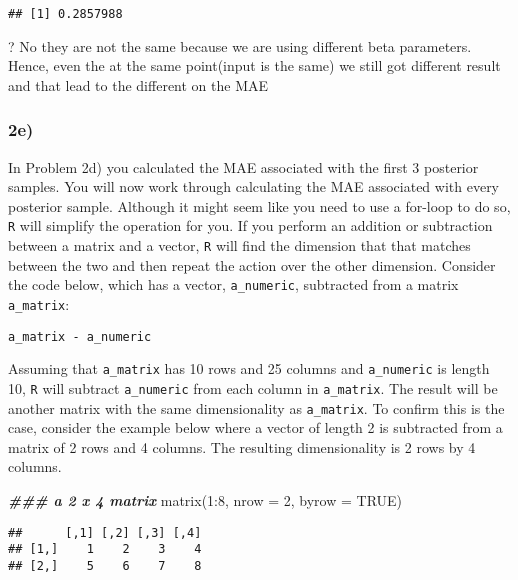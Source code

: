 \documentclass[
]{article}
\newenvironment{Shaded}{\begin{snugshade}}{\end{snugshade}}
\newcommand{\AttributeTok}[1]{\textcolor[rgb]{0.77,0.63,0.00}{#1}}
\newcommand{\ConstantTok}[1]{\textcolor[rgb]{0.00,0.00,0.00}{#1}}
\newcommand{\DecValTok}[1]{\textcolor[rgb]{0.00,0.00,0.81}{#1}}
\newcommand{\DocumentationTok}[1]{\textcolor[rgb]{0.56,0.35,0.01}{\textbf{\textit{#1}}}}
\newcommand{\FunctionTok}[1]{\textcolor[rgb]{0.00,0.00,0.00}{#1}}
\newcommand{\NormalTok}[1]{#1}
\newcommand{\SpecialCharTok}[1]{\textcolor[rgb]{0.00,0.00,0.00}{#1}}
\begin{document}
\begin{verbatim}
## [1] 0.2857988
\end{verbatim}

? No they are not the same because we are using different beta
parameters. Hence, even the at the same point(input is the same) we
still got different result and that lead to the different on the MAE

\hypertarget{e-1}{%
\subsubsection{2e)}\label{e-1}}

In Problem 2d) you calculated the MAE associated with the first 3
posterior samples. You will now work through calculating the MAE
associated with every posterior sample. Although it might seem like you
need to use a for-loop to do so, \texttt{R} will simplify the operation
for you. If you perform an addition or subtraction between a matrix and
a vector, \texttt{R} will find the dimension that that matches between
the two and then repeat the action over the other dimension. Consider
the code below, which has a vector, \texttt{a\_numeric}, subtracted from
a matrix \texttt{a\_matrix}:

\texttt{a\_matrix\ -\ a\_numeric}

Assuming that \texttt{a\_matrix} has 10 rows and 25 columns and
\texttt{a\_numeric} is length 10, \texttt{R} will subtract
\texttt{a\_numeric} from each column in \texttt{a\_matrix}. The result
will be another matrix with the same dimensionality as
\texttt{a\_matrix}. To confirm this is the case, consider the example
below where a vector of length 2 is subtracted from a matrix of 2 rows
and 4 columns. The resulting dimensionality is 2 rows by 4 columns.

\begin{Shaded}
\begin{Highlighting}[]
\DocumentationTok{\#\#\# a 2 x 4 matrix}
\FunctionTok{matrix}\NormalTok{(}\DecValTok{1}\SpecialCharTok{:}\DecValTok{8}\NormalTok{, }\AttributeTok{nrow =} \DecValTok{2}\NormalTok{, }\AttributeTok{byrow =} \ConstantTok{TRUE}\NormalTok{)}
\end{Highlighting}
\end{Shaded}

\begin{verbatim}
##      [,1] [,2] [,3] [,4]
## [1,]    1    2    3    4
## [2,]    5    6    7    8
\end{verbatim}
\end{document}
